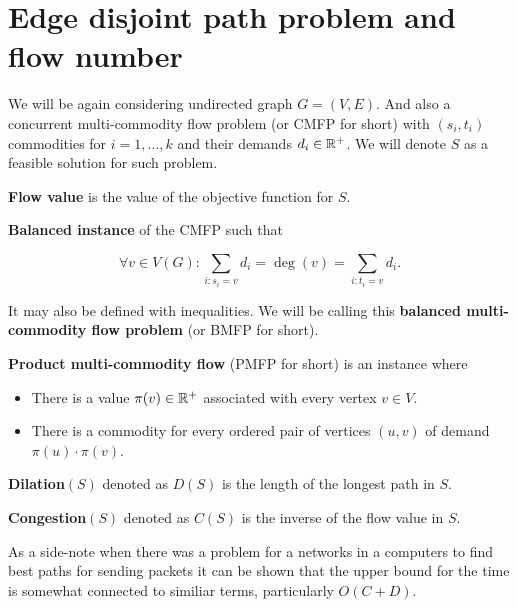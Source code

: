 \section{Edge disjoint path problem and flow number}

We will be again considering undirected graph $G=(V,E)$. And also a concurrent multi-commodity flow problem (or CMFP for short) with $(s_{i}, t_{i})$ commodities for $i = 1, \dots, k$ and their demands $d_{i} \in \mathbb{R}^{+}$. We will denote $S$ as a feasible solution for such problem.

\begin{defn}
	\textbf{Flow value} is the value of the objective function for $S$.
\end{defn}

\begin{defn}
	\textbf{Balanced instance} of the CMFP such that
	
	$$
	\forall v \in V(G) : \sum_{i: s_{i} = v} d_{i} = \deg(v) = \sum_{i: t_{i} = v} d_{i}.
	$$
\end{defn}

It may also be defined with inequalities. We will be calling this \textbf{balanced multi-commodity flow problem} (or BMFP for short).

\begin{defn}
	\textbf{Product multi-commodity flow} (PMFP for short) is an instance where
	
	\begin{itemize}
		\item There is a value $\pi(v) \in \mathbb{R}^+$ associated with every vertex $v \in V$.
		\item There is a commodity for every ordered pair of vertices $(u,v)$ of demand $\pi(u) \cdot \pi(v)$.
	\end{itemize}
\end{defn}

\begin{defn}
	\textbf{Dilation}$(S)$ denoted as $D(S)$ is the length of the longest path in $S$.
\end{defn}

\begin{defn}
	\textbf{Congestion}$(S)$ denoted as $C(S)$ is the inverse of the flow value in $S$.
\end{defn}

As a side-note when there was a problem for a networks in a computers to find best paths for sending packets it can be shown that the upper bound for the time is somewhat connected to similiar terms, particularly $O(C + D)$.

